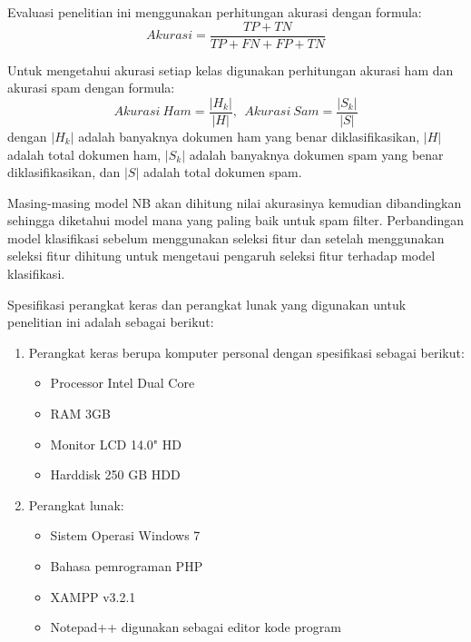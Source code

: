 \noindent Evaluasi penelitian ini menggunakan perhitungan akurasi dengan formula:
\begin{equation*}
	Akurasi=\frac{TP+TN}{TP+FN+FP+TN}
\end{equation*}

Untuk mengetahui akurasi setiap kelas digunakan perhitungan akurasi ham dan akurasi spam dengan formula:
\begin{equation*}
Akurasi~Ham=\frac{|H_k|}{|H|},~~Akurasi~Sam=\frac{|S_k|}{|S|}
\end{equation*}
\noindent dengan $|H_k|$ adalah banyaknya dokumen ham yang benar diklasifikasikan, $|H|$ adalah total dokumen ham, $|S_k|$ adalah banyaknya dokumen spam yang benar diklasifikasikan, dan $|S|$ adalah total dokumen spam.

Masing-masing model NB akan dihitung nilai akurasinya kemudian dibandingkan sehingga diketahui model mana yang paling baik untuk spam filter. Perbandingan model klasifikasi sebelum menggunakan seleksi fitur dan setelah menggunakan seleksi fitur dihitung untuk mengetaui pengaruh seleksi fitur terhadap model klasifikasi.

Spesifikasi perangkat keras dan perangkat lunak yang digunakan untuk penelitian ini adalah sebagai berikut:
\begin{enumerate}
	\item Perangkat keras berupa komputer personal dengan spesifikasi sebagai berikut:
	\begin{itemize}
		\item Processor Intel Dual Core
		\item RAM 3GB
		\item Monitor LCD 14.0" HD
		\item Harddisk 250 GB HDD
	\end{itemize}
	\item Perangkat lunak:
	\begin{itemize}
		\item Sistem Operasi Windows 7
		\item Bahasa pemrograman PHP
		\item XAMPP v3.2.1
		\item Notepad++ digunakan sebagai editor kode program
	\end{itemize}
\end{enumerate}

